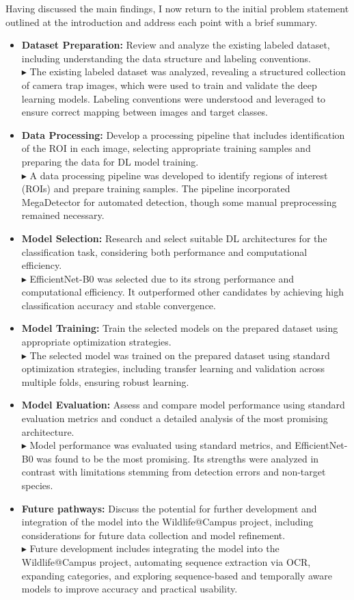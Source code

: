 Having discussed the main findings, I now return to the initial problem statement outlined at the introduction and address each point with a brief summary.
\begin{itemize}
    \item \textbf{Dataset Preparation:} Review and analyze the existing labeled dataset, including understanding the data structure and labeling conventions.\\
    $\blacktriangleright$ The existing labeled dataset was analyzed, revealing a structured collection of camera trap images, which were used to train and validate the deep learning models. Labeling conventions were understood and leveraged to ensure correct mapping between images and target classes.
    \item \textbf{Data Processing:} Develop a processing pipeline that includes identification of the \ac{ROI} in each image, selecting appropriate training samples and preparing the data for \ac{DL} model training.\\
    $\blacktriangleright$ A data processing pipeline was developed to identify regions of interest (ROIs) and prepare training samples. The pipeline incorporated MegaDetector for automated detection, though some manual preprocessing remained necessary.
    \item \textbf{Model Selection:} Research and select suitable \ac{DL} architectures for the classification task, considering both performance and computational efficiency.\\
    $\blacktriangleright$ EfficientNet-B0 was selected due to its strong performance and computational efficiency. It outperformed other candidates by achieving high classification accuracy and stable convergence.
    \item \textbf{Model Training:} Train the selected models on the prepared dataset using appropriate optimization strategies.\\
    $\blacktriangleright$ The selected model was trained on the prepared dataset using standard optimization strategies, including transfer learning and validation across multiple folds, ensuring robust learning.
    \item \textbf{Model Evaluation:} Assess and compare model performance using standard evaluation metrics and conduct a detailed analysis of the most promising architecture.\\
    $\blacktriangleright$ Model performance was evaluated using standard metrics, and EfficientNet-B0 was found to be the most promising. Its strengths were analyzed in contrast with limitations stemming from detection errors and non-target species.
    \item \textbf{Future pathways:} Discuss the potential for further development and integration of the model into the Wildlife@Campus project, including considerations for future data collection and model refinement.\\
    $\blacktriangleright$ Future development includes integrating the model into the Wildlife@Campus project, automating sequence extraction via OCR, expanding categories, and exploring sequence-based and temporally aware models to improve accuracy and practical usability.
\end{itemize}

